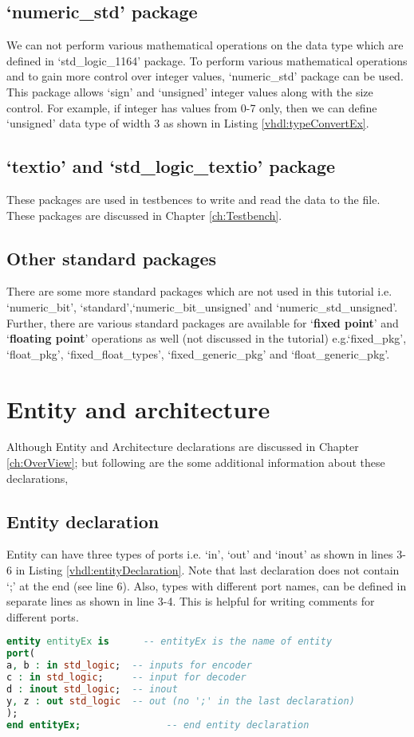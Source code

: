 \subsection{`numeric\_std' package}
We can not perform various mathematical operations on the data type which are defined in `std\_logic\_1164' package. To perform various mathematical operations and to gain more control over integer values, `numeric\_std' package can be used. This package allows `sign' and `unsigned' integer values along with the size control. For example, if integer has values from 0-7 only, then we can define `unsigned' data type of width 3 as shown in Listing \ref{vhdl:typeConvertEx}.

\subsection{`textio' and `std\_logic\_textio' package} 
These packages are used in testbences to write and read the data to the file. These packages are discussed in Chapter \ref{ch:Testbench}.

\subsection{Other standard packages}
There are some more standard packages which are not used in this tutorial i.e. `numeric\_bit', `standard',`numeric\_bit\_unsigned' and `numeric\_std\_unsigned'. Further, there are various standard packages are available for `\textbf{fixed point}' and `\textbf{floating point}' operations as well (not discussed in the tutorial) e.g.`fixed\_pkg', `float\_pkg', `fixed\_float\_types', `fixed\_generic\_pkg' and `float\_generic\_pkg'. 

\section{Entity and architecture}
Although Entity and Architecture declarations are discussed in Chapter \ref{ch:OverView}; but following are the some additional information about these declarations, 

\subsection{Entity declaration}
Entity can have three types of ports i.e. `in', `out' and `inout' as shown in lines 3-6 in Listing \ref{vhdl:entityDeclaration}. Note that last declaration does not contain `;' at the end (see line 6). Also, types with different port names, can be defined in separate lines as shown in line 3-4. This is helpful for writing comments for different ports. 
\begin{lstlisting}[language=Vhdl, caption={Entity Declaration}, label= {vhdl:entityDeclaration}]
entity entityEx is      -- entityEx is the name of entity
port(
a, b : in std_logic;  -- inputs for encoder
c : in std_logic;     -- input for decoder
d : inout std_logic;  -- inout
y, z : out std_logic  -- out (no ';' in the last declaration)
); 
end entityEx; 			    -- end entity declaration 
\end{lstlisting}


